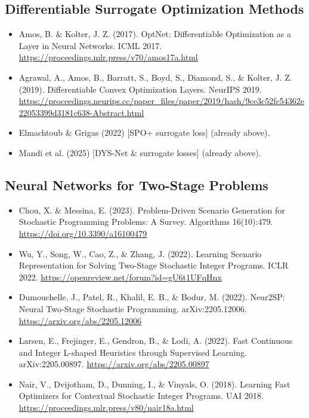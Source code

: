 \documentclass{article}
\begin{document}
\subsection*{Differentiable Surrogate Optimization Methods}
\begin{itemize}
  \item Amos, B. \& Kolter, J. Z. (2017). OptNet: Differentiable Optimization as a Layer in Neural Networks. ICML 2017. \url{https://proceedings.mlr.press/v70/amos17a.html}
  \item Agrawal, A., Amos, B., Barratt, S., Boyd, S., Diamond, S., \& Kolter, J. Z. (2019). Differentiable Convex Optimization Layers. NeurIPS 2019. \url{https://proceedings.neurips.cc/paper_files/paper/2019/hash/9ce3c52fc54362e22053399d3181c638-Abstract.html}
  \item Elmachtoub \& Grigas (2022) [SPO+ surrogate loss] (already above).
  \item Mandi et al. (2025) [DYS-Net \& surrogate losses] (already above).
\end{itemize}

\subsection*{Neural Networks for Two-Stage Problems}
\begin{itemize}
  \item Chou, X. \& Messina, E. (2023). Problem-Driven Scenario Generation for Stochastic Programming Problems: A Survey. Algorithms 16(10):479. \url{https://doi.org/10.3390/a16100479}
  \item Wu, Y., Song, W., Cao, Z., \& Zhang, J. (2022). Learning Scenario Representation for Solving Two-Stage Stochastic Integer Programs. ICLR 2022. \url{https://openreview.net/forum?id=gU6t1UFqHnx}
  \item Dumouchelle, J., Patel, R., Khalil, E. B., \& Bodur, M. (2022). Neur2SP: Neural Two-Stage Stochastic Programming. arXiv:2205.12006. \url{https://arxiv.org/abs/2205.12006}
  \item Larsen, E., Frejinger, E., Gendron, B., \& Lodi, A. (2022). Fast Continuous and Integer L-shaped Heuristics through Supervised Learning. arXiv:2205.00897. \url{https://arxiv.org/abs/2205.00897}
  \item Nair, V., Dvijotham, D., Dunning, I., \& Vinyals, O. (2018). Learning Fast Optimizers for Contextual Stochastic Integer Programs. UAI 2018. \url{https://proceedings.mlr.press/v80/nair18a.html}
\end{itemize}
\end{document}
